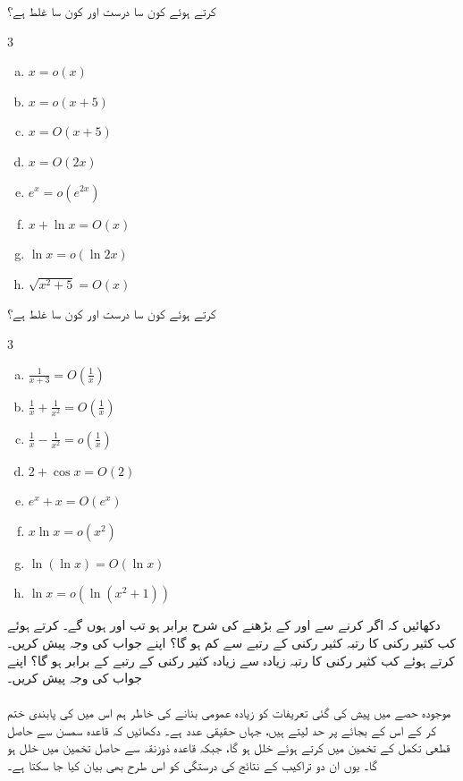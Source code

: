  کرتے ہوئے کون سا درست اور کون سا غلط ہے؟
\begin{multicols}{3}
\begin{enumerate}[a.]
\item
$x=o(x)$
\item
$x=o(x+5)$
\item
$x=O(x+5)$
\item
$x=O(2x)$
\item
$e^x=o(e^{2x})$
\item
$x+\ln x=O(x)$
\item
$\ln x=o(\ln 2x)$
\item
$\sqrt{x^2+5}=O(x)$
\end{enumerate}
\end{multicols}
 کرتے ہوئے کون سا درست اور کون سا غلط ہے؟
\begin{multicols}{3}
\begin{enumerate}[a.]
\item
$\frac{1}{x+3}=O(\tfrac{1}{x})$
\item
$\frac{1}{x}+\frac{1}{x^2}=O(\tfrac{1}{x})$
\item
$\frac{1}{x}-\frac{1}{x^2}=o(\tfrac{1}{x})$
\item
$2+\cos x=O(2)$
\item
$e^x+x=O(e^x)$
\item
$x\ln x=o(x^2)$
\item
$\ln(\ln x)=O(\ln x)$
\item
$\ln x=o(\ln(x^2+1))$
\end{enumerate}
\end{multicols}
دکھائیں کہ اگر  کرنے سے  اور  کے بڑھنے کی شرح برابر ہو تب  اور  ہوں گے۔
 کرتے ہوئے کب کثیر رکنی  کا رتبہ کثیر رکنی  کے رتبے سے کم ہو گا؟ اپنے جواب کی وجہ پیش کریں۔
 کرتے ہوئے کب کثیر رکنی  کا رتبہ زیادہ سے زیادہ کثیر رکنی  کے رتبے  کے برابر ہو گا؟ اپنے جواب کی وجہ پیش
 کریں۔\\
\\
موجودہ حصے  میں پیش کی گئی تعریفات  کو زیادہ عمومی بنانے کی خاطر ہم اس میں  کی پابندی ختم کر کے اس  کے بجائے  پر حد لیتے ہیں، جہاں  حقیقی عدد ہے۔ دکھائیں کہ قاعدہ سمسن سے حاصل قطعی تکمل کے تخمین میں  کرتے ہوئے خلل  ہو گا، جبکہ قاعدہ ذوزنقہ سے حاصل تخمین میں خلل  ہو گا۔ یوں ان دو تراکیب کے نتائج کی درستگی کو اس طرح بھی بیان کیا جا سکتا ہے۔  

